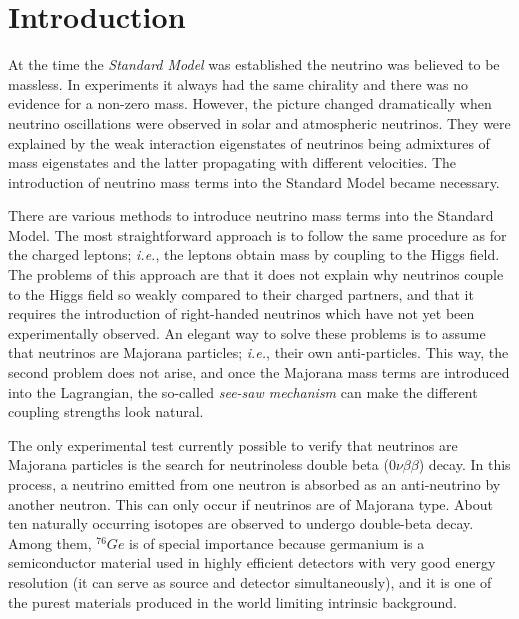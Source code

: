 {}
\chapter*{Introduction}
\label{cha:intro}
At the time the \emph{Standard Model} was established the neutrino was
believed to be massless. In experiments it always had the same
chirality and there was no evidence for a non-zero mass. However, the
picture changed dramatically when neutrino oscillations were observed
in solar and atmospheric neutrinos. They were explained by the weak
interaction eigenstates of neutrinos being admixtures of mass
eigenstates and the latter propagating with different velocities. The
introduction of neutrino mass terms into the Standard Model became
necessary.

There are various methods to introduce neutrino mass terms into the
Standard Model. The most straightforward approach is to follow the
same procedure as for the charged leptons; \textit{i.e.}, the leptons
obtain mass by coupling to the Higgs field. The problems of this
approach are that it does not explain why neutrinos couple to the
Higgs field so weakly compared to their charged partners, and that it
requires the introduction of right-handed neutrinos which have not yet
been experimentally observed. An elegant way to solve these problems
is to assume that neutrinos are Majorana particles; \textit{i.e.},
their own anti-particles. This way, the second problem does not arise,
and once the Majorana mass terms are introduced into the Lagrangian,
the so-called \emph{see-saw mechanism} can make the different coupling
strengths look natural.

The only experimental test currently possible to verify that neutrinos
are Majorana particles is the search for neutrinoless double beta
($0\nu\beta\beta$) decay. In this process, a neutrino emitted from one
neutron is absorbed as an anti-neutrino by another neutron. This can
only occur if neutrinos are of Majorana type. About ten naturally
occurring isotopes are observed to undergo double-beta decay. Among
them, $^{76}Ge$ is of special importance because germanium is a
semiconductor material used in highly efficient detectors with very
good energy resolution (it can serve as source and detector
simultaneously), and it is one of the purest materials produced in the
world limiting intrinsic background.

